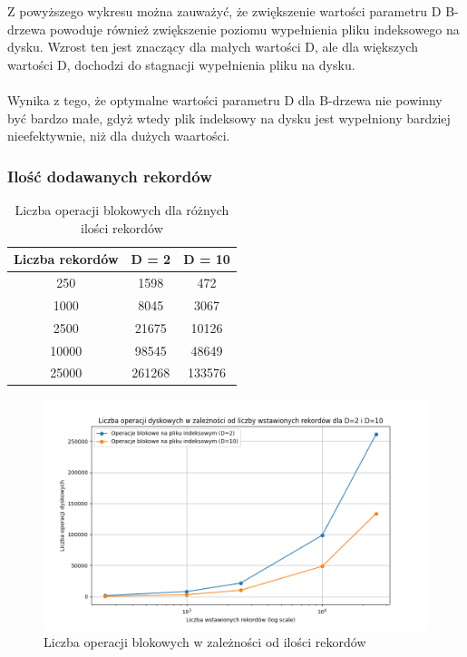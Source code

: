 \documentclass[12pt]{article}
\begin{document}
Z powyższego wykresu można zauważyć, że zwiększenie wartości parametru D B-drzewa powoduje
również zwiększenie poziomu wypełnienia pliku indeksowego na dysku. Wzrost ten jest
znaczący dla małych wartości D, ale dla większych wartości D, dochodzi do stagnacji wypełnienia
pliku na dysku.
\\\\
Wynika z tego, że optymalne wartości parametru D dla B-drzewa
nie powinny być bardzo małe, gdyż wtedy plik indeksowy na dysku jest wypełniony bardziej nieefektywnie,
niż dla dużych waartości.

\subsubsection{Ilość dodawanych rekordów}
\begin{table}[H]
\centering
\caption{Liczba operacji blokowych dla różnych ilości rekordów}
\begin{tabular}{|c|c|c|}
\hline
Liczba rekordów & D = 2 & D = 10 \\
\hline
250 & 1598 & 472 \\
1000 & 8045 & 3067 \\
2500 & 21675 & 10126 \\
10000 & 98545 & 48649 \\
25000 & 261268 & 133576 \\
\hline
\end{tabular}
\end{table}

\begin{figure}[H]
    \centering
    \includegraphics[width=\textwidth]{../Plots/disk_operations_by_record_count.png}
    \caption{Liczba operacji blokowych w zależności od ilości rekordów}
    \label{fig:plot3}
\end{figure}
\end{document}
